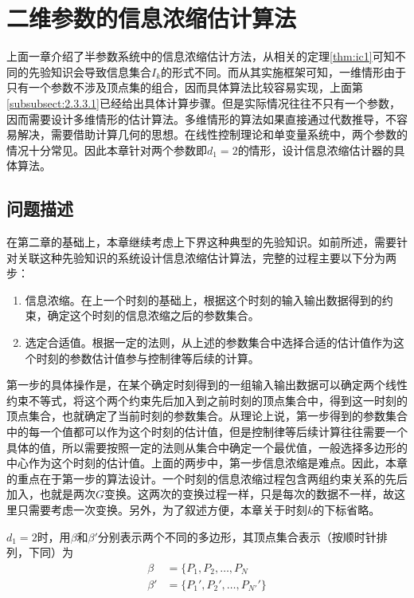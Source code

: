 \chapter{二维参数的信息浓缩估计算法}\label{chap:3}
上面一章介绍了半参数系统中的信息浓缩估计方法，从相关的定理\ref{thm:ic1}可知不同的先验知识会导致信息集合$I_{k}$的形式不同。而从其实施框架可知，一维情形由于只有一个参数不涉及顶点集的组合，因而具体算法比较容易实现，上面第\ref{subsubsect:2.3.3.1}已经给出具体计算步骤。但是实际情况往往不只有一个参数，因而需要设计多维情形的估计算法。多维情形的算法如果直接通过代数推导，不容易解决，需要借助计算几何的思想。在线性控制理论和单变量系统中，两个参数的情况十分常见。因此本章针对两个参数即$d_{1}=2$的情形，设计信息浓缩估计器的具体算法。
\section{问题描述}\label{sect:3.1}
在第二章的基础上，本章继续考虑上下界这种典型的先验知识。如前所述，需要针对关联这种先验知识的系统设计信息浓缩估计算法，完整的过程主要以下分为两步：
\begin{enumerate}
\item 信息浓缩。在上一个时刻的基础上，根据这个时刻的输入输出数据得到的约束，确定这个时刻的信息浓缩之后的参数集合。
\item 选定合适值。根据一定的法则，从上述的参数集合中选择合适的估计值作为这个时刻的参数估计值参与控制律等后续的计算。
\end{enumerate}

第一步的具体操作是，在某个确定时刻得到的一组输入输出数据可以确定两个线性约束不等式，将这个两个约束先后加入到之前时刻的顶点集合中，得到这一时刻的顶点集合，也就确定了当前时刻的参数集合。从理论上说，第一步得到的参数集合中的每一个值都可以作为这个时刻的估计值，但是控制律等后续计算往往需要一个具体的值，所以需要按照一定的法则从集合中确定一个最优值，一般选择多边形的中心作为这个时刻的估计值。上面的两步中，第一步信息浓缩是难点。因此，本章的重点在于第一步的算法设计。一个时刻的信息浓缩过程包含两组约束关系的先后加入，也就是两次$G$变换。这两次的变换过程一样，只是每次的数据不一样，故这里只需要考虑一次变换。另外，为了叙述方便，本章关于时刻$k$的下标省略。

$d_{1}=2$时，用$\beta$和$\beta'$分别表示两个不同的多边形，其顶点集合表示（按顺时针排列，下同）为
\begin{equation*}%
\begin{split}%
\beta&=\{P_{1},P_{2},\ldots,P_{N}\\
\beta'&=\{P_{1}',P_{2}',\ldots,P_{N'}'\}
\end{split}
\end{equation*}

